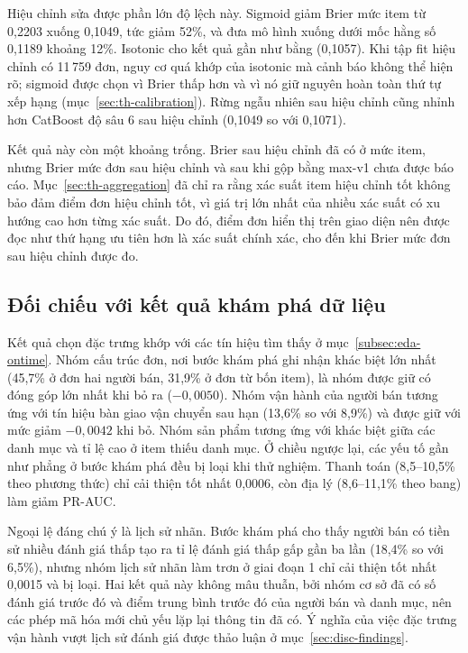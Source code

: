 \documentclass[12pt,a4paper]{report}
\begin{document}
Hiệu chỉnh sửa được phần lớn độ lệch này. Sigmoid giảm Brier mức item từ 0,2203 xuống 0,1049, tức giảm 52\%, và đưa mô hình xuống dưới mốc hằng số 0,1189 khoảng 12\%. Isotonic cho kết quả gần như bằng (0,1057). Khi tập fit hiệu chỉnh có 11\,759 đơn, nguy cơ quá khớp của isotonic mà \textcite{niculescumizil2005} cảnh báo không thể hiện rõ; sigmoid được chọn vì Brier thấp hơn và vì nó giữ nguyên hoàn toàn thứ tự xếp hạng (mục~\ref{sec:th-calibration}). Rừng ngẫu nhiên sau hiệu chỉnh cũng nhỉnh hơn CatBoost độ sâu 6 sau hiệu chỉnh (0,1049 so với 0,1071).

Kết quả này còn một khoảng trống. Brier sau hiệu chỉnh đã có ở mức item, nhưng Brier mức đơn sau hiệu chỉnh và sau khi gộp bằng max-v1 chưa được báo cáo. Mục~\ref{sec:th-aggregation} đã chỉ ra rằng xác suất item hiệu chỉnh tốt không bảo đảm điểm đơn hiệu chỉnh tốt, vì giá trị lớn nhất của nhiều xác suất có xu hướng cao hơn từng xác suất. Do đó, điểm đơn hiển thị trên giao diện nên được đọc như thứ hạng ưu tiên hơn là xác suất chính xác, cho đến khi Brier mức đơn sau hiệu chỉnh được đo.

\subsection{Đối chiếu với kết quả khám phá dữ liệu}\label{sec:analysis-eda}

Kết quả chọn đặc trưng khớp với các tín hiệu tìm thấy ở mục~\ref{subsec:eda-ontime}. Nhóm cấu trúc đơn, nơi bước khám phá ghi nhận khác biệt lớn nhất (45,7\% ở đơn hai người bán, 31,9\% ở đơn từ bốn item), là nhóm được giữ có đóng góp lớn nhất khi bỏ ra ($-0{,}0050$). Nhóm vận hành của người bán tương ứng với tín hiệu bàn giao vận chuyển sau hạn (13,6\% so với 8,9\%) và được giữ với mức giảm $-0{,}0042$ khi bỏ. Nhóm sản phẩm tương ứng với khác biệt giữa các danh mục và tỉ lệ cao ở item thiếu danh mục. Ở chiều ngược lại, các yếu tố gần như phẳng ở bước khám phá đều bị loại khi thử nghiệm. Thanh toán (8,5--10,5\% theo phương thức) chỉ cải thiện tốt nhất 0,0006, còn địa lý (8,6--11,1\% theo bang) làm giảm PR-AUC.

Ngoại lệ đáng chú ý là lịch sử nhãn. Bước khám phá cho thấy người bán có tiền sử nhiều đánh giá thấp tạo ra tỉ lệ đánh giá thấp gấp gần ba lần (18,4\% so với 6,5\%), nhưng nhóm lịch sử nhãn làm trơn ở giai đoạn 1 chỉ cải thiện tốt nhất 0,0015 và bị loại. Hai kết quả này không mâu thuẫn, bởi nhóm cơ sở đã có số đánh giá trước đó và điểm trung bình trước đó của người bán và danh mục, nên các phép mã hóa mới chủ yếu lặp lại thông tin đã có. Ý nghĩa của việc đặc trưng vận hành vượt lịch sử đánh giá được thảo luận ở mục~\ref{sec:disc-findings}.
\end{document}

